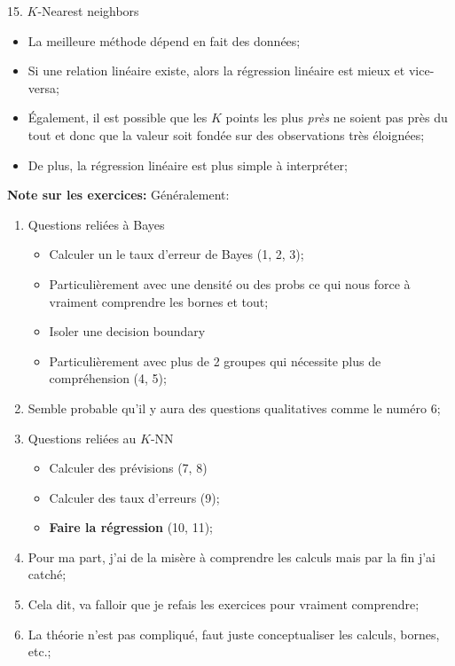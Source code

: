 \documentclass[12pt, titlepage, french]{report}
\begin{document}
\begin{CHPT_SUMM}[label = {PCA-KNN}]{15. $K$-Nearest neighbors}
\begin{enumerate}
\begin{itemize}
		\texttt{[image: src/ISLR-KNN-CLASSIF-K-regression-LINE.png]}
		\item	La meilleure méthode dépend en fait des données;
		\item[]	Si une relation linéaire existe, alors la régression linéaire est mieux et vice-versa;
		\item	Également, il est possible que les $K$ points les plus \textit{près} ne soient pas près du tout et donc que la valeur soit fondée sur des observations très éloignées;
		\item	De plus, la régression linéaire est plus simple à interpréter;
		\end{itemize}
\end{enumerate}
\textbf{Note sur les exercices:} Généralement:
\begin{enumerate}
	\item	Questions reliées à Bayes 
		\begin{itemize}
		\item	Calculer un le taux d'erreur de Bayes (1, 2, 3);
		\item[]	Particulièrement avec une densité ou des probs ce qui nous force à vraiment comprendre les bornes et tout;
		\item	Isoler une decision boundary
		\item[] Particulièrement avec plus de 2 groupes qui nécessite plus de compréhension (4, 5);
		\end{itemize}	
	\item	Semble probable qu'il y aura des questions qualitatives comme le numéro 6;
	\item	Questions reliées au $K$-NN 
		\begin{itemize}
		\item	Calculer des prévisions (7, 8)
		\item	Calculer des taux d'erreurs (9);
		\item	\textbf{Faire la régression} (10, 11);
		\end{itemize}
	\item	Pour ma part, j'ai de la misère à comprendre les calculs mais par la fin j'ai catché;
	\item[]	Cela dit, va falloir que je refais les exercices pour vraiment comprendre;
	\item[]	La théorie n'est pas compliqué, faut juste conceptualiser les calculs, bornes, etc.;
\end{enumerate}
\end{CHPT_SUMM}
\end{document}
